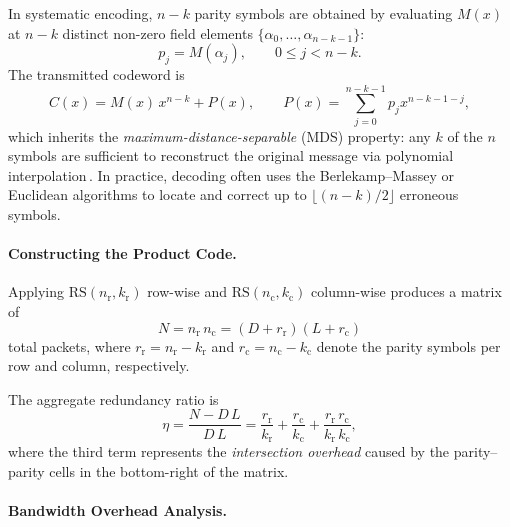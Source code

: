 In systematic encoding, \(n-k\) parity symbols are obtained by evaluating \(M(x)\) at \(n-k\) distinct non-zero field elements \(\{\alpha_0,\dots,\alpha_{n-k-1}\}\):
\begin{equation}
	p_j = M(\alpha_j), \qquad 0 \le j < n-k.
\end{equation}
The transmitted codeword is  
\begin{equation}
	C(x) = M(x)\,x^{n-k} + P(x), \qquad
	P(x) = \sum_{j=0}^{n-k-1} p_j x^{n-k-1-j},
	\label{eq:rs_codeword}
\end{equation}
which inherits the \emph{maximum-distance-separable} (MDS) property: any \(k\) of the \(n\) symbols are sufficient to reconstruct the original message via polynomial interpolation\,\cite{rs_intro}.  
In practice, decoding often uses the Berlekamp--Massey or Euclidean algorithms to locate and correct up to \(\lfloor (n-k)/2 \rfloor\) erroneous symbols.

\paragraph{Constructing the Product Code.}
Applying \(\mathrm{RS}(n_{\mathrm r},k_{\mathrm r})\) row-wise and \(\mathrm{RS}(n_{\mathrm c},k_{\mathrm c})\) column-wise produces a matrix of  
\begin{equation}
	N = n_{\mathrm r} \, n_{\mathrm c} = (D + r_{\mathrm r})(L + r_{\mathrm c})
\end{equation}
total packets, where \(r_{\mathrm r} = n_{\mathrm r} - k_{\mathrm r}\) and \(r_{\mathrm c} = n_{\mathrm c} - k_{\mathrm c}\) denote the parity symbols per row and column, respectively.  

The aggregate redundancy ratio is  
\begin{equation}
	\eta = \frac{N - D\,L}{D\,L}
	= \frac{r_{\mathrm r}}{k_{\mathrm r}}
	+ \frac{r_{\mathrm c}}{k_{\mathrm c}}
	+ \frac{r_{\mathrm r} \, r_{\mathrm c}}{k_{\mathrm r} \, k_{\mathrm c}},
\end{equation}
where the third term represents the \emph{intersection overhead} caused by the parity--parity cells in the bottom-right of the matrix.  

\paragraph{Bandwidth Overhead Analysis.}
\label{sec:bandwidth overhead analysis}

